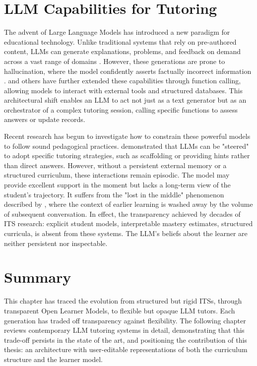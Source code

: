 \documentclass[logo,bsc,singlespacing,parskip,online]{infthesis}
\begin{document}
\section{LLM Capabilities for Tutoring}

The advent of Large Language Models has introduced a new paradigm for educational technology. Unlike traditional systems that rely on pre-authored content, LLMs can generate explanations, problems, and feedback on demand across a vast range of domains \citep{openai2023gpt4,kasneci2023chatgpt}. However, these generations are prone to hallucination, where the model confidently asserts factually incorrect information \citep{ji2023survey}. \citet{openai2023functions} and others have further extended these capabilities through function calling, allowing models to interact with external tools and structured databases. This architectural shift enables an LLM to act not just as a text generator but as an orchestrator of a complex tutoring session, calling specific functions to assess answers or update records.

Recent research has begun to investigate how to constrain these powerful models to follow sound pedagogical practices. \citet{puech2025stratl} demonstrated that LLMs can be "steered" to adopt specific tutoring strategies, such as scaffolding or providing hints rather than direct answers. However, without a persistent external memory or a structured curriculum, these interactions remain episodic. The model may provide excellent support in the moment but lacks a long-term view of the student's trajectory. It suffers from the "lost in the middle" phenomenon described by \citet{liu2023lostinthemiddle}, where the context of earlier learning is washed away by the volume of subsequent conversation. In effect, the transparency achieved by decades of ITS research: explicit student models, interpretable mastery estimates, structured curricula, is absent from these systems. The LLM's beliefs about the learner are neither persistent nor inspectable.

\section{Summary}

This chapter has traced the evolution from structured but rigid ITSs, through transparent Open Learner Models, to flexible but opaque LLM tutors. Each generation has traded off transparency against flexibility. The following chapter reviews contemporary LLM tutoring systems in detail, demonstrating that this trade-off persists in the state of the art, and positioning the contribution of this thesis: an architecture with user-editable representations of both the curriculum structure and the learner model.
\end{document}
